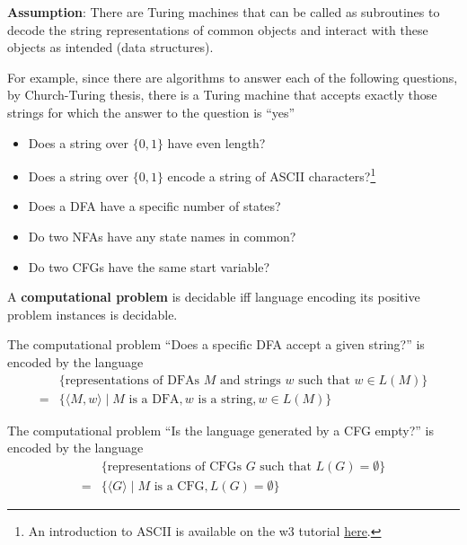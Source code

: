 \documentclass[12pt, oneside]{article}
\begin{document}
    {\bf Assumption}: There are Turing  machines that can be called as subroutines
    to decode the string representations of common objects and  interact with these objects as intended
    (data structures).
    
    
    For example, since there are algorithms to answer each of the following questions,
    by Church-Turing thesis, there is a Turing machine that accepts exactly those strings for which the 
    answer to the question is ``yes''
    \begin{itemize}
        \item Does a string over $\{0,1\}$ have even length?

        \vfill

        \item Does a string over $\{0,1\}$ encode a string of ASCII characters?\footnote{An introduction to ASCII 
        is available on the w3 tutorial \href{https://www.w3schools.com/charsets/ref_html_ascii.asp}{here}.}

        \vfill

        \item Does a DFA have a specific number of states?

        \vfill

        \item Do two NFAs have any state names in common?

        \vfill

        \item Do two CFGs have the same start variable?

        \vfill

      \end{itemize}

\newpage

A {\bf computational problem} is decidable iff language encoding its positive problem instances
is decidable.

The computational problem ``Does a specific DFA accept a given string?'' is encoded by the language
\begin{align*}
  &\{ \textrm{representations of DFAs $M$ and strings $w$ such that $w \in L(M)$}\}  \\
  =& \{ \langle M, w \rangle \mid M \textrm{ is a DFA}, w \textrm{ is a string}, w \in L(M) \}
\end{align*}

The computational problem ``Is the language generated by a CFG empty?'' is encoded by the language
\begin{align*}
  &\{ \textrm{representations of CFGs $G$  such that $L(G) = \emptyset$}\}  \\
  =& \{ \langle G \rangle \mid M \textrm{ is a CFG},  L(G) = \emptyset \}
\end{align*}
\end{document}
